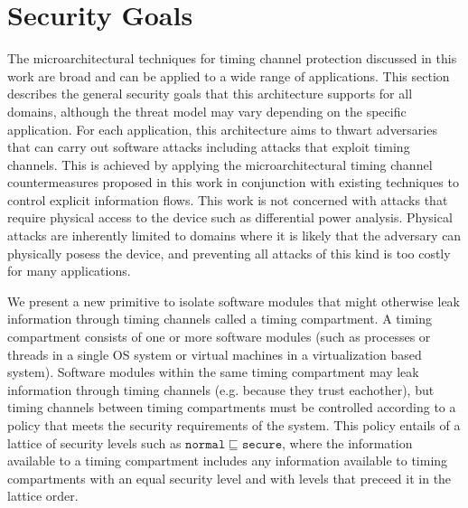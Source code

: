 \section{Security Goals}
    The microarchitectural techniques for timing channel protection discussed 
    in this work are broad and can be applied to a wide range of applications.  
    This section describes the general security goals that this architecture 
    supports for all domains, although the threat model may vary depending on 
    the specific application. For each application, this architecture aims to 
    thwart adversaries that can carry out software attacks including attacks
    that exploit timing channels. This is achieved by applying the 
    microarchitectural timing channel countermeasures proposed in this work in 
    conjunction with existing techniques to control explicit information flows. 
    This work is not concerned with attacks that require physical access to the 
    device such as differential power analysis. Physical attacks are inherently 
    limited to domains where it is likely that the adversary can physically 
    posess the device, and preventing all attacks of this kind is too costly 
    for many applications.

    We present a new primitive to isolate software modules that might otherwise 
    leak information through timing channels called a timing compartment.  A 
    timing compartment consists of one or more software modules (such as 
    processes or threads in a single OS system or virtual machines in a 
    virtualization based system).  Software modules within the same timing 
    compartment may leak information through timing channels (e.g. because they 
    trust eachother), but timing channels between timing compartments must be 
    controlled according to a policy that meets the security requirements of 
    the system. This policy entails of a lattice of security levels such as 
    $\mathtt{normal} \sqsubseteq \mathtt{secure}$, where the information 
    available to a timing compartment includes any information available to 
    timing compartments with an equal security level and with levels that 
    preceed it in the lattice order. 


